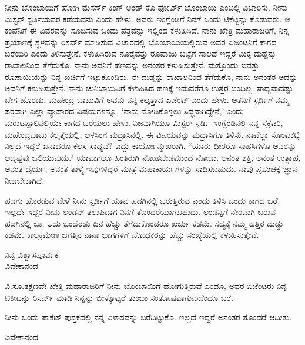 ನೀನು ಬೊಂಬಾಯಿಗೆ ಹೋಗಿ ಮೆಸರ್ಸ್ ಕಿಂಗ್ ಅಂಡ್ ಕೊ ಫೋರ್ಟ್ ಬೊಂಬಾಯಿ ಎಂಬಲ್ಲಿ ವಿಚಾರಿಸು. ನೀನು ಮಿಸ್ಟರ್ ಸ್ಟರ್ಡಿಯವರ ಕಡೆಯವನು ಎಂದು ಹೇಳು. ಅವರು ಇಂಗ್ಲೆಂಡಿಗೆ ನಿನಗೆ ಒಂದು ಟಿಕೆಟ್ಟನ್ನು ಕೊಡುವರು. ಆ ಕಂಪೆನಿಗೆ ಈ ವಿವರವನ್ನು ಸೂಚಿಸುವ ಒಂದು ಪತ್ರವನ್ನು ಇಲ್ಲಿಂದ ಕಳುಹಿಸಿದೆ. ನಾನು ಖೇತ್ರಿ ಮಹಾರಾಜರಿಗೆ, ನಿನ್ನ ಪ್ರಯಾಣಕ್ಕೆ ಸ್ಥಳವನ್ನು ರಿಸರ್ವ್ ಮಾಡಿಸುವ ವಿಚಾರದಲ್ಲಿ ಬೊಂಬಾಯಿಯಲ್ಲಿರುವ ಅವರ ಏಜಂಟನಿಗೆ ಕಾಗದ ಬರೆಯಿರಿ ಎಂದು ತಿಳಿಸುತ್ತೇನೆ. ಕಳುಹಿಸಿರುವ ನೂರೈವತ್ತು ರೂಪಾಯಿ ಬಟ್ಟೆಗೆ ಸಾಲದೆ ಇದ್ದರೆ ಮಿಕ್ಕ ದುಡ್ಡನ್ನು ರಾಖಾಲನಿಂದ ತೆಗೆದುಕೊ. ನಾನು ಅವನಿಗೆ ಹಣವನ್ನು ಅನಂತರ ಕಳುಹಿಸುತ್ತೇನೆ. ಮತ್ತೊಂದು ಐವತ್ತು ರೂಪಾಯಿಯನ್ನು ನಿನ್ನ ಖರ್ಚಿಗೆ ಇಟ್ಟುಕೊಂಡಿರು. ಈ ದುಡ್ಡನ್ನು ರಾಖಾಲನಿಂದ ತೆಗೆದುಕೊ, ನಾನು ಅನಂತರ ಅದನ್ನು ಅವನಿಗೆ ಕಳುಹಿಸುತ್ತೇನೆ. ನಾನು ಚುನಿಬಾಬುವಿಗೆ ಕಳುಹಿಸಿದ ಹಣಕ್ಕೆ ಇದುವರೆಗೂ ಉತ್ತರ ಬಂದಿಲ್ಲ. ಸಾಧ್ಯವಾದಷ್ಟು ಬೇಗ ಹೊರಡು. ಮಹೇಂದ್ರ ಬಾಬುವಿಗೆ ಅವನು ನನ್ನ ಕಲ್ಕತ್ತಾದ ಏಜೆಂಟ್ ಎಂದು ಹೇಳು. ಆತನಿಗೆ ಸ್ಟರ್ಡಿಗೆ ನಮ್ಮ ಪರವಾಗಿ ಎಲ್ಲಾ ವ್ಯಾಪಾರದ ವಿಷಯಗಳನ್ನೂ, ‘ನಾನು ನೋಡಿಕೊಳ್ಳಲು ಸಿದ್ಧನಾಗಿದ್ದೇನೆ,’ ಎಂದು ಮರುಟಪ್ಪಾಲಿನಲ್ಲಿಯೇ ಕಾಗದ ಬರೆಯಲು ಹೇಳು. ನಿಜವಾಗಿಯೂ ಮಿಸ್ಟರ್ ಸ್ಟರ್ಡಿ ಇಂಗ್ಲೆಂಡಿನಲ್ಲಿ ನನ್ನ ಸೆಕ್ರೆಟರಿ, ಮಹೇಂದ್ರಬಾಬು ಕಲ್ಕತ್ತೆಯಲ್ಲಿ, ಅಳಸಿಂಗ ಮದ್ರಾಸಿನಲ್ಲಿ. ಈ ವಿಷಯವನ್ನು ಮದ್ರಾಸಿಗೂ ತಿಳಿಸು. ನಾವೆಲ್ಲಾ ಸೊಂಟಕಟ್ಟಿ ನಿಲ್ಲದೆ ಇದ್ದರೆ ಏನಾದರೂ ಕೆಲಸ ಸಾಧ್ಯವೆ? ಎದ್ದು ಕಾರ್ಯೋನ್ಮುಖರಾಗಿ. “ಯಾರು ಧೀರರೊ ಸಾಹಸಿಗಳೊ ಅವರನ್ನು ಅದೃಷ್ಟವು ಒಲಿಯುವುದು.“ ಯಾವಾಗಲೂ ಹಿಂತಿರುಗಿ ನೋಡಬೇಡ\enginline{-}ಮುಂದೆ ನೋಡು. ಅನಂತ ಶಕ್ತಿ, ಅನಂತ ಉತ್ಸಾಹ, ಅನಂತ ಧೈರ್ಯ, ಅನಂತ ತಾಳ್ಮೆ ಇವುಗಳಿದ್ದರೆ ಮಾತ್ರ ಮಹಾಕಾರ್ಯಗಳನ್ನು ಸಾಧಿಸಬಹುದು. ನಾವು ಪ್ರಪಂಚಕ್ಕೆ ಜ್ಞಾನ ನೀಡಬೇಕಾಗಿದೆ.

ಹಡಗು ಹೊರಡುವ ವೇಳೆ ನೀನು ಸ್ಟರ್ಡಿಗೆ ಯಾವ ಹಡಗಿನಲ್ಲಿ ಬರುತ್ತಿರುವೆ ಎಂದು ತಿಳಿಸಿ ಒಂದು ಕಾಗದ ಬರೆ. ಇಲ್ಲದೇ ಇದ್ದರೆ ನೀನು ಲಂಡನ್ ತಲುಪಿದಾಗ ನಿನಗೆ ತೊಂದರೆಯಾಗಬಹುದು. ಲಂಡನ್ನಿಗೆ ನೇರವಾಗಿ ಬರುವ ಹಡಗಿನಲ್ಲಿ ಬಾ. ಅದು ಒಂದೆರಡು ದಿನ ಹೆಚ್ಚು ತೆಗೆದುಕೊಂಡರೂ ಖರ್ಚು ಕಡಮೆ. ಸದ್ಯಕ್ಕೆ ನಮ್ಮ ಹತ್ತಿರ ದುಡ್ಡು ಕಡಮೆ. ಕಾಲಕ್ರಮೇಣ ಜಗತ್ತಿನ ನಾನಾ ಭಾಗಗಳಿಗೆ ಬೋಧಕರನ್ನು ಹೆಚ್ಚು ಸಂಖ್ಯೆಯಲ್ಲಿ ಕಳುಹಿಸುತ್ತೇವೆ.
\vspace{-0.5cm}

\begin{flushright}
ನಿನ್ನ ವಿಶ್ವಾಸಪೂರ್ವಕ\\ವಿವೇಕಾನಂದ
\end{flushright}
\vspace{-0.3cm}

ವಿ.ಸೂ.\enginline{-}ತಕ್ಷಣವೇ ಖೇತ್ರಿ ಮಹಾರಾಜರಿಗೆ ನೀನು ಬೊಂಬಾಯಿಗೆ ಹೋಗುತ್ತಿರುವೆ ಎಂದೂ, ಅವರ ಏಜೆಂಟರು ನಿನ್ನ ಟಿಕೀಟನ್ನು ರಿಸರ್ವ್ ಮಾಡಿ ನಿನ್ನನ್ನು ಬೀಳ್ಕೊಟ್ಟರೆ ತುಂಬಾ ಸಂತೋಷವಾಗುವುದೆಂದೂ ಬರೆ.

ನೀನು ಒಂದು ಪಾಕೆಟ್ ಪುಸ್ತಕದಲ್ಲಿ ನನ್ನ ವಿಳಾಸವನ್ನು ಬರೆದಿಟ್ಟುಕೊ. ಇಲ್ಲದೆ ಇದ್ದರೆ ಅನಂತರ ತೊಂದರೆ ಆದೀತು.

\vspace{-0.3cm}

{\flushright
ವಿವೇಕಾನಂದ\par}
\vspace{-0.3cm}

